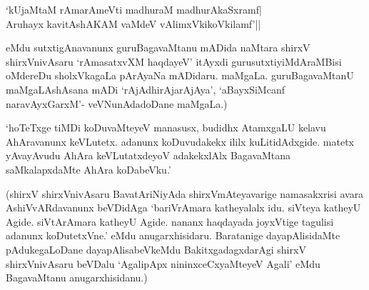 \begin{shloka} 
`kUjaMtaM rAmarAmeVti madhuraM madhurAkaSxramf|\label{169}\\ 
Aruhayx kavitAshAKAM vaMdeV vAlimxVkikoVkilamf'||
\end{shloka} 

eMdu sutxtigAnavanunx guruBagavaMtanu mADida naMtara shirxV shirxVnivAsaru `rAmasatxvXM haqdayeV' itAyxdi gurusutxtiyiMdAraMBisi oMdereDu sholxVkagaLa pArAyaNa mADidaru. maMgaLa. guruBagavaMtanU maMgaLAshAsana mADi `rAjAdhirAjarAjAya', `aBayxSiMcanf naravAyxGarxM'- veVNunAdadoDane maMgaLa.) 

`hoTeTxge tiMDi koDuvaMteyeV manasusx, budidhx AtamxgaLU kelavu AhAravanunx keVLutetx. adanunx koDuvudakekx ililx kuLitidAdxgide. matetx yAvayAvudu AhAra keVLutatxdeyoV adakekxlAlx BagavaMtana saMkalapxdaMte AhAra koDabeVku.' 

(shirxV shirxVnivAsaru BavatAriNiyAda shirxVmAteyavarige namasakxrisi avara AshiVvARdavanunx beVDidAga `bariVrAmara katheyalalx idu. siVteya katheyU Agide. siVtArAmara katheyU Agide. nananx haqdayada joyxVtige tagulisi adanunx koDutetxVne.' eMdu anugarxhisidaru. Baratanige dayapAlisidaMte pAdukegaLoDane dayapAlisabeVkeMdu BakitxgadagxdarAgi shirxV shirxVnivAsaru beVDalu `AgalipApx nininxceCxyaMteyeV Agali' eMdu BagavaMtanu anugarxhisidanu.) 
